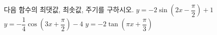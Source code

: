 다음 함수의 최댓값, 최솟값, 주기를 구하시오.
 $y=-2\sin\left(2x-\dfrac{\pi}{2}\right)+1$
 $y=-\dfrac{1}{4}\cos\left(3x+\dfrac{\pi}{2}\right)-4$
 $y=-2\tan\left(\pi x+\dfrac{\pi}{3}\right)$
